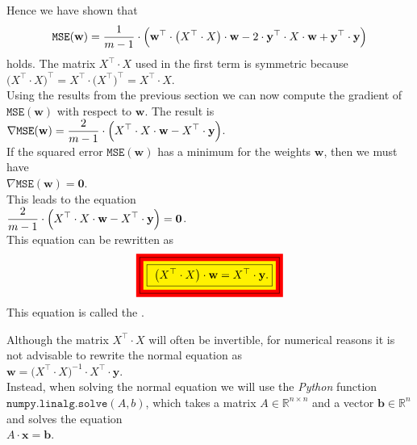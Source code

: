 Hence we have shown that
\begin{equation}
  \label{eq:squared-error-4}
  \mathtt{MSE}(\mathbf{w}) = \displaystyle \frac{1}{m-1} \cdot \Bigl(\mathbf{w}^\top \cdot \bigl(X^\top \cdot X\bigr) \cdot \mathbf{w} 
                                             - 2 \cdot \textbf{y}^\top \cdot X \cdot \mathbf{w} 
                                             + \mathbf{y}^\top \cdot \mathbf{y}
                                        \Bigr)
\end{equation}
holds.  The matrix $X^\top \cdot X$ used in the first term is symmetric because
\\[0.2cm]
\hspace*{1.3cm}
$\bigl(X^\top \cdot X\bigr)^\top = X^\top \cdot \bigl(X^\top\bigr)^\top = X^\top \cdot X$.
\\[0.2cm]
Using the results from the previous section we can now compute the gradient of $\mathtt{MSE}(\mathbf{w})$ with respect to
$\mathbf{w}$.  The result is
\\[0.2cm]
\hspace*{1.3cm}
$\displaystyle \nabla \mathtt{MSE}(\mathbf{w}) = \frac{2}{m-1} \cdot \Bigl(X^\top \cdot X \cdot \mathbf{w} - X^\top \cdot \mathbf{y}\Bigr)$.
\\[0.2cm]
If the squared error $\mathtt{MSE}(\mathbf{w})$ has a minimum for the weights $\mathbf{w}$, then we must have
\\[0.2cm]
\hspace*{1.3cm}
$\nabla \mathtt{MSE}(\mathbf{w}) = \mathbf{0}$.
\\[0.2cm]
This leads to the equation
\\[0.2cm]
\hspace*{1.3cm}
$\displaystyle\frac{2}{m-1} \cdot \Bigl(X^\top \cdot X \cdot \mathbf{w} - X^\top \cdot \mathbf{y}\Bigr) = \mathbf{0}$.
\\[0.2cm]
This equation can be rewritten as
\begin{equation}
  \label{eq:normal-equation}
 \colorbox{red}{\framebox{\colorbox{yellow}{\framebox{
 $\ds\bigl(X^\top \cdot X\bigr) \cdot \mathbf{w} = X^\top \cdot \mathbf{y}$.}}}} 
\end{equation}
This equation is called the .  

\remark
Although the matrix $X^\top \cdot X$ will often be invertible, for numerical reasons it is not
advisable to rewrite the normal equation as
\\[0.2cm]
\hspace*{1.3cm}
$\mathbf{w} = \bigl(X^\top \cdot X)^{-1} \cdot X^\top \cdot \mathbf{y}$.
\\[0.2cm]
Instead, when solving the normal equation we will use the \textsl{Python} function $\texttt{numpy.linalg.solve}(A,b)$, which
takes a matrix $A \in \mathbb{R}^{n \times n}$ and a vector $\mathbf{b} \in \mathbb{R}^n$ and solves the equation
\\[0.2cm]
\hspace*{1.3cm}
$A \cdot \mathbf{x} = \mathbf{b}$.  \eox

